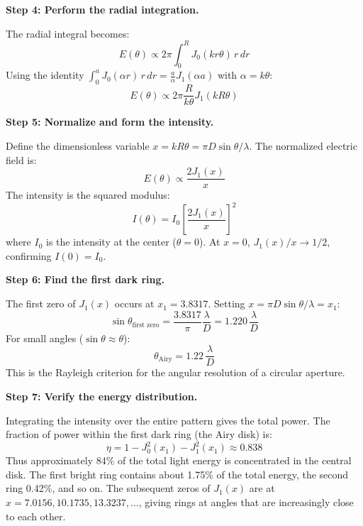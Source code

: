 \textbf{Step 4: Perform the radial integration.}

The radial integral becomes:
\begin{equation}
E(\theta) \propto 2\pi\int_0^R J_0(kr\theta)\,r\,dr
\end{equation}
Using the identity $\int_0^a J_0(\alpha r)\,r\,dr = \frac{a}{\alpha}J_1(\alpha a)$ with $\alpha = k\theta$:
\begin{equation}
E(\theta) \propto 2\pi\frac{R}{k\theta}J_1(kR\theta)
\end{equation}

\textbf{Step 5: Normalize and form the intensity.}

Define the dimensionless variable $x = kR\theta = \pi D\sin\theta/\lambda$. The normalized electric field is:
\begin{equation}
E(\theta) \propto \frac{2J_1(x)}{x}
\end{equation}
The intensity is the squared modulus:
\begin{equation}
I(\theta) = I_0\left[\frac{2J_1(x)}{x}\right]^2
\end{equation}
where $I_0$ is the intensity at the center ($\theta = 0$). At $x = 0$, $J_1(x)/x \to 1/2$, confirming $I(0) = I_0$.

\textbf{Step 6: Find the first dark ring.}

The first zero of $J_1(x)$ occurs at $x_1 = 3.8317$. Setting $x = \pi D\sin\theta/\lambda = x_1$:
\begin{equation}
\sin\theta_{\text{first zero}} = \frac{3.8317}{\pi}\frac{\lambda}{D} = 1.220\,\frac{\lambda}{D}
\end{equation}
For small angles ($\sin\theta \approx \theta$):
\begin{equation}
\theta_{\text{Airy}} = 1.22\,\frac{\lambda}{D}
\end{equation}
This is the Rayleigh criterion for the angular resolution of a circular aperture.

\textbf{Step 7: Verify the energy distribution.}

Integrating the intensity over the entire pattern gives the total power. The fraction of power within the first dark ring (the Airy disk) is:
\begin{equation}
\eta = 1 - J_0^2(x_1) - J_1^2(x_1) \approx 0.838
\end{equation}
Thus approximately 84\% of the total light energy is concentrated in the central disk. The first bright ring contains about 1.75\% of the total energy, the second ring 0.42\%, and so on. The subsequent zeros of $J_1(x)$ are at $x = 7.0156, 10.1735, 13.3237, \ldots$, giving rings at angles that are increasingly close to each other.

